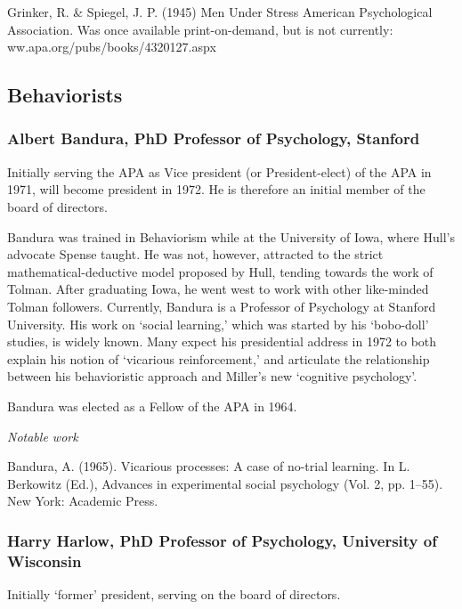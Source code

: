 \begin{refsection}
Grinker, R. \& Spiegel, J. P. (1945) Men Under Stress American Psychological Association. Was once available print-on-demand, but is not currently: ww.apa.org\slash pubs\slash books\slash 4320127.aspx

\subsection{Behaviorists}
\label{behaviorists}

\subsubsection{Albert Bandura, PhD Professor of Psychology, Stanford}
\label{albertbanduraphdprofessorofpsychologystanford}

Initially serving the APA as Vice president (or President-elect) of the APA in 1971, will become president in 1972. He is therefore an initial member of the board of directors.

Bandura was trained in Behaviorism while at the University of Iowa, where Hull's advocate Spense taught. He was not, however, attracted to the strict mathematical-deductive model proposed by Hull, tending towards the work of Tolman. After graduating Iowa, he went west to work with other like-minded Tolman followers. Currently, Bandura is a Professor of Psychology at Stanford University. His work on `social learning,' which was started by his `bobo-doll' studies, is widely known. Many expect his presidential address in 1972 to both explain his notion of `vicarious reinforcement,' and articulate the relationship between his behavioristic approach and Miller's new `cognitive psychology'.

Bandura was elected as a Fellow of the APA in 1964.

\emph{Notable work}

Bandura, A. (1965). Vicarious processes: A case of no-trial learning. In L. Berkowitz (Ed.), Advances in experimental social psychology (Vol. 2, pp. 1--55). New York: Academic Press.

\subsubsection{Harry Harlow, PhD Professor of Psychology, University of Wisconsin}
\label{harryharlowphdprofessorofpsychologyuniversityofwisconsin}

Initially `former' president, serving on the board of directors.


\end{refsection}
